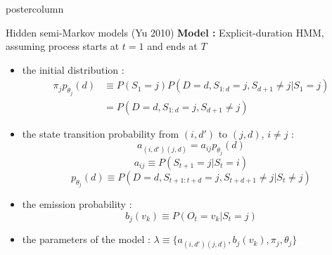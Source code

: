 \documentclass[final,hyperref={pdfpagelabels=false}]{beamer}
\begin{document}
\begin{frame}
\begin{columns}
\begin{column}{.50\textwidth}
\begin{beamercolorbox}[center,wd=\textwidth]{postercolumn}
\begin{minipage}[T]{.98\textwidth}
{\begin{block}{Hidden semi-Markov models (Yu 2010)}
                \vskip0.5cm
                \textbf{Model :} Explicit-duration HMM, assuming process starts at $t=1$ and ends at $T$
                \vskip0cm
                \begin{itemize}
                    \item[\bullet] the initial distribution :
                    {\small
                        \begin{align*}
                            \pi_j p_{\theta_j}(d) & \equiv P(S_1 = j)P(D=d, S_{1:d} = j, S_{d+1} \neq j | S_1 = j)\\
                            & = P(D=d, S_{1:d} = j, S_{d+1} \neq j)
                        \end{align*}
                    }
                    \item[\bullet] the state transition probability from $(i,d')$ to $(j,d)$, $i \neq j$ :
                    {\small
                        $$a_{(i,d')(j,d)}=a_{ij}p_{\theta_j}(d)$$
                        $$a_{ij} \equiv P(S_{t+1} = j | S_t = i)$$
                        $$p_{\theta_j}(d) \equiv P(D=d, S_{t+1:t+d} = j, S_{t+d+1} \neq j | S_t \neq j)$$
                    }
                    \item[\bullet] the emission probability :
                    {\small $$b_{j}(v_k) \equiv P(O_t = v_k | S_{t} = j)$$}
                    \item[\bullet] the parameters of the model : $\lambda \equiv \{a_{(i,d')(j,d)},b_{j}(v_{k}), \pi_{j}, \theta_j\}$
                \end{itemize}

            \end{block}
          }
        \end{minipage}
      \end{beamercolorbox}
    \end{column}


\end{columns}
\end{frame}
\end{document}
